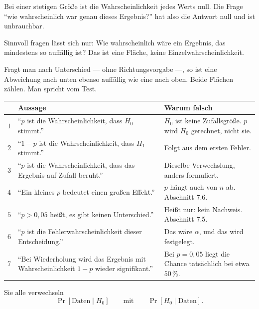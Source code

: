 \begin{merksatz}
Bei einer stetigen Größe ist die Wahrscheinlichkeit jedes  Werts null. Die Frage \enquote{wie wahrscheinlich war genau dieses Ergebnis?} hat also die Antwort null und ist unbrauchbar.

Sinnvoll fragen lässt sich nur: Wie wahrscheinlich wäre ein Ergebnis, das mindestens so auffällig ist? Das ist eine Fläche, keine Einzelwahrscheinlichkeit.

Fragt man nach  Unterschied --- ohne Richtungsvorgabe ---, so ist eine Abweichung nach unten ebenso auffällig wie eine nach oben. Beide Flächen zählen. Man spricht vom  Test.
\end{merksatz}

\begin{warnung}
\begin{center}
{\small
\renewcommand{\arraystretch}{1.5}
\begin{tabular}{@{}P{0.7cm}P{3.8cm}P{3.8cm}@{}}
\toprule
& \textbf{Aussage} & \textbf{Warum falsch}\\
\midrule
$1$ & \enquote{$p$ ist die Wahrscheinlichkeit, dass $H_0$ stimmt.} & $H_0$ ist keine Zufallsgröße. $p$ wird  $H_0$ gerechnet, nicht  sie.\\
$2$ & \enquote{$1-p$ ist die Wahrscheinlichkeit, dass $H_1$ stimmt.} & Folgt aus dem ersten Fehler.\\
$3$ & \enquote{$p$ ist die Wahrscheinlichkeit, dass das Ergebnis auf Zufall beruht.} & Dieselbe Verwechslung, anders formuliert.\\
$4$ & \enquote{Ein kleines $p$ bedeutet einen großen Effekt.} & $p$ hängt auch von $n$ ab. Abschnitt 7.6.\\
$5$ & \enquote{$p > 0{,}05$ heißt, es gibt keinen Unterschied.} & Heißt nur: kein Nachweis. Abschnitt 7.5.\\
$6$ & \enquote{$p$ ist die Fehlerwahrscheinlichkeit dieser Entscheidung.} & Das wäre $\alpha$, und das wird  festgelegt.\\
$7$ & \enquote{Bei Wiederholung wird das Ergebnis mit Wahrscheinlichkeit $1-p$ wieder signifikant.} & Bei $p = 0{,}05$ liegt die Chance tatsächlich bei etwa $50\,\%$.\\
\bottomrule
\end{tabular}}
\end{center}

Sie alle verwechseln
\[ \Pr[\text{Daten} \mid H_0] \qquad \text{mit} \qquad \Pr[H_0 \mid \text{Daten}] . \]


\end{warnung}
